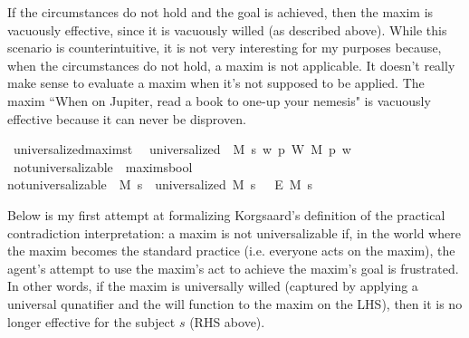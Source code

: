 \begin{isabellebody}
\begin{isamarkuptext}
If the circumstances do not hold and the goal is achieved, then the maxim is vacuously effective, since 
it is vacuously willed (as described above). While this scenario is counterintuitive, it is not very 
interesting for my purposes because, when the circumstances do not hold, a maxim is not applicable. It 
doesn't really make sense to evaluate a maxim when it's not supposed to be applied. The maxim ``When on Jupiter,
read a book to one-up your nemesis" is vacuously effective because it can never be disproven.%
\end{isamarkuptext}\isamarkuptrue%
\isamarkupfalse%
\ universalized{\isacharcolon}{\isacharcolon}{\isachardoublequoteopen}maxim{\isasymRightarrow}s{\isasymRightarrow}t{\isachardoublequoteclose}\ \ \isanewline
{\isachardoublequoteopen}universalized\ {\isasymequiv}\ {\isasymlambda}M\ s{\isachardot}\ {\isacharparenleft}{\isasymlambda}w{\isachardot}\ {\isacharparenleft}{\isasymforall}p{\isachardot}\ W\ M\ p\ w{\isacharparenright}{\isacharparenright}{\isachardoublequoteclose}\isanewline
\isanewline
{}\isamarkupfalse%
\ not{\isacharunderscore}universalizable\ {\isacharcolon}{\isacharcolon}\ {\isachardoublequoteopen}maxim{\isasymRightarrow}s{\isasymRightarrow}bool{\isachardoublequoteclose}\ \ \isanewline
{\isachardoublequoteopen}not{\isacharunderscore}universalizable\ {\isasymequiv}\ {\isasymlambda}M\ s{\isachardot}\ {\isacharparenleft}{\isasymTurnstile}\ {\isacharparenleft}universalized\ M\ s\ \isactrlbold {\isasymrightarrow}\ {\isacharparenleft}\isactrlbold {\isasymnot}\ {\isacharparenleft}E\ M\ s{\isacharparenright}{\isacharparenright}{\isacharparenright}{\isacharparenright}{\isachardoublequoteclose}\isanewline
%
%
\begin{isamarkuptext}%
Below is my first attempt at formalizing Korgsaard's definition of the practical contradiction
interpretation:  a maxim is not universalizable 
if, in the world where the maxim becomes the standard practice (i.e. everyone acts on the maxim), the
agent's attempt to use the maxim's act to achieve the maxim's goal is frustrated. In other words, if 
the maxim is universally willed (captured by applying a universal qunatifier and the will function 
to the maxim on the LHS), then it is no longer effective for the subject $s$ (RHS above).%
\end{isamarkuptext}\isamarkuptrue%

\end{isabellebody}
